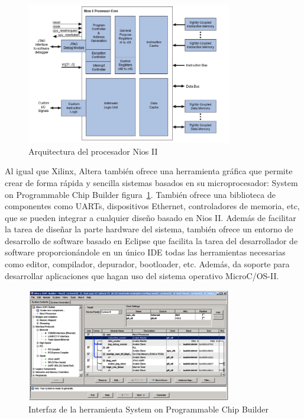 \begin{figure}[h!]
 	\begin{center}
  	\includegraphics[width=0.8\textwidth,keepaspectratio=true]{./images/nios2}
  	\caption{Arquitectura del procesador Nios II}
 	\end{center}
	\end{figure}

Al igual que Xilinx, Altera también ofrece una herramienta gráfica que permite crear de forma rápida y sencilla sistemas basados en su microprocesador: System on Programmable Chip Builder \cite{Etiqueta28}figura~\ref{fig:System on Programmable Chip Builder}. También ofrece una biblioteca de componentes como UARTs, dispositivos Ethernet, controladores de memoria, etc, que se pueden integrar a cualquier diseño basado en Nios II.
Además de facilitar la tarea de diseñar la parte hardware del sistema, también ofrece un entorno de desarrollo de software basado en Eclipse que facilita la tarea del desarrollador de software proporcionándole en un único IDE todas las herramientas necesarias como editor, compilador, depurador, bootloader, etc. Además, da soporte para desarrollar aplicaciones que hagan uso del sistema operativo MicroC/OS-II.

	\begin{figure}[h!]
 	\begin{center}
  	\includegraphics[width=0.8\textwidth,keepaspectratio=true]{./images/herramientasnios2}
  	\caption{Interfaz de la herramienta System on Programmable Chip Builder}
  	\label{fig:System on Programmable Chip Builder}
 	\end{center}
	\end{figure}
\newpage
